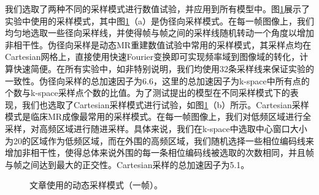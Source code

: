 我们选取了两种不同的采样模式进行数值试验，并应用到所有模型中。图\ref{fig:mask}展示了实验中使用的采样模式，其中图\ref{fig:mask}（a）是伪径向采样模式。在每一帧图像上，我们均匀地选取一些径向采样线，并使得帧与帧之间的采样线随机转动一个角度以增加非相干性。伪径向采样是动态MR重建数值试验中常用的采样模式，其采样点均在Cartesian网格上，直接使用快速Fourier变换即可实现频率域到图像域的转化，计算快速简便。在所有实验中，如非特别说明，我们均使用32条采样线来保证实验的一致性。伪径向采样的总加速因子为6.6，这里的总加速因子为k-space中所有点的个数与k-space采样点个数的比值。为了测试提出的模型在不同采样模式下的表现，我们也选取了Cartesian采样模式进行试验，如图\ref{fig:mask}（b）所示。Cartesian采样模式是临床MR成像最常用的采样模式。在每一帧图像上，我们对低频区域进行全采样，对高频区域进行随进采样。具体来说，我们在k-space中选取中心窗口大小为20的区域作为低频区域，而在外围的高频区域，我们随机选择一些相位编码线来增加非相干性，使得总体来说外围的每一条相位编码线被选取的次数相同，并且帧与帧之间达到最大的正交性。Cartesian采样的总加速因子为5.1。
\begin{figure}[htbp]
\centering
{}
\centering
\caption{文章使用的动态采样模式（一帧）。}
\label{fig:mask}
\end{figure}

